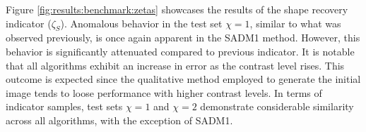 			
			Figure \ref{fig:results:benchmark:zetas} showcases the results of the shape recovery indicator ($\zeta_S$). Anomalous behavior in the test set $\chi=1$, similar to what was observed previously, is once again apparent in the SADM1 method. However, this behavior is significantly attenuated compared to previous indicator. It is notable that all algorithms exhibit an increase in error as the contrast level rises. This outcome is expected since the qualitative method employed to generate the initial image tends to loose performance with higher contrast levels. In terms of indicator samples, test sets $\chi=1$ and $\chi=2$ demonstrate considerable similarity across all algorithms, with the exception of SADM1.
		
